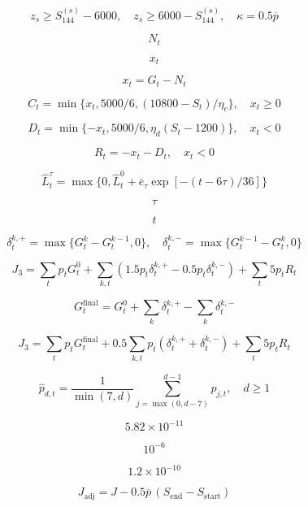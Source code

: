 \[
z_s\geq S_{144}^{(s)}-6000,\quad z_s\geq6000-S_{144}^{(s)},\quad\kappa=0.5\overline p
\]

\[
N_t
\]

\[
x_t
\]

\[
x_t=G_t-N_t
\]

\[
C_t=\min\{x_t,5000/6,(10800-S_t)/\eta_c\},\quad x_t\geq0
\]

\[
D_t=\min\{-x_t,5000/6,\eta_d(S_t-1200)\},\quad x_t<0
\]

\[
R_t=-x_t-D_t,\quad x_t<0
\]

\[
\widehat L_t^{\tau}=\max\{0,\widehat L_t^0+\overline e_{\tau}\exp[-(t-6\tau)/36]\}
\]

\[
\tau
\]

\[
t
\]

\[
\delta_t^{k,+}=\max\{G_t^k-G_t^{k-1},0\},\quad\delta_t^{k,-}=\max\{G_t^{k-1}-G_t^k,0\}
\]

\[
J_3=\sum_t p_tG_t^0+\sum_{k,t}(1.5p_t\delta_t^{k,+}-0.5p_t\delta_t^{k,-})+\sum_t5p_tR_t
\]

\[
G_t^{\mathrm{final}}=G_t^0+\sum_k\delta_t^{k,+}-\sum_k\delta_t^{k,-}
\]

\[
J_3=\sum_t p_tG_t^{\mathrm{final}}+0.5\sum_{k,t}p_t(\delta_t^{k,+}+\delta_t^{k,-})+\sum_t5p_tR_t
\]

\[
\widehat p_{d,t}=\frac{1}{\min(7,d)}\sum_{j=\max(0,d-7)}^{d-1}p_{j,t},\quad d\geq1
\]

\[
5.82\times10^{-11}
\]

\[
10^{-6}
\]

\[
1.2\times10^{-10}
\]

\[
J_{\mathrm{adj}}=J-0.5\overline p\,(S_{\mathrm{end}}-S_{\mathrm{start}})
\]